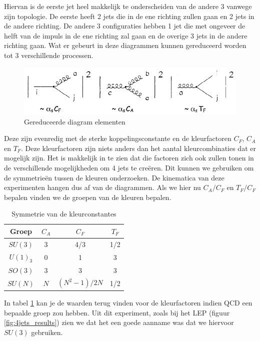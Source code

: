 \documentclass[../main.tex]{subfiles}
\begin{document}
Hiervan is de eerste jet heel makkelijk te onderscheiden van de andere 3 vanwege zijn topologie. De eerste heeft 2 jets die in de ene richting zullen gaan en 2 jets in de andere richting. De andere 3 configuraties hebben 1 jet die met ongeveer de helft van de impuls in de ene richting zal gaan en de overige 3 jets in de andere richting gaan. Wat er gebeurt in deze diagrammen kunnen gereduceerd worden tot 3 verschillende processen.

\begin{figure}[h]
    \centering
    \includegraphics[width=0.8\linewidth]{QCD/reduced_events.png}
    \caption{Gereduceerde diagram elementen}%
    \label{fig:reduced_events}
\end{figure}

Deze zijn evenredig met de sterke koppelingsconstante en de kleurfactoren $C_F$, $C_A$ en $T_F$. Deze kleurfactoren zijn niets anders dan het aantal kleurcombinaties dat er mogelijk zijn. Het is makkelijk in te zien dat die factoren zich ook zullen tonen in de verschillende mogelijkheden om 4 jets te creëren. Dit kunnen we gebruiken om de symmetrieën tussen de kleuren onderzoeken. De kinematica van deze experimenten hangen dus af van de diagrammen. Als we hier nu $C_A/C_F$ en $T_F/C_F$ bepalen vinden we de groepen van de kleuren bepalen.

\begin{table}[h]
    \centering
    \caption{Symmetrie van de kleurconstantes}
    \label{tab:sym_kleurfact}
    \begin{tabular}{|c|c|c|c|}
        \hline
        Groep   & $C_A$ & $C_F$         & $T_F$ \\
        \hline
        $SU(3)$ & 3     & 4/3           & 1/2   \\
        $U(1)_3$& 0     & 1             & 3     \\
        $SO(3)$ & 3     & 3             & 3     \\
        $SU(N)$ & $N$   & $(N^2-1)/2N$  & 1/2   \\
        \hline
    \end{tabular}
\end{table}

In tabel \ref{tab:sym_kleurfact} kan je de waarden terug vinden voor de kleurfactoren indien QCD een bepaalde groep zou hebben. Uit dit experiment, zoals bij het LEP (figuur \ref{fig:4jets_results}) zien we dat het een goede aanname was dat we hiervoor $SU(3)$ gebruiken.
\end{document}
